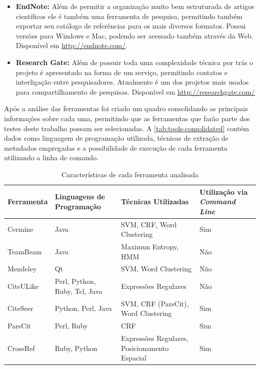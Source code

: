 \begin{itemize}
    \item \textbf{EndNote:} Além de permitir a organização muito bem estruturada de artigos científicos ele é também uma ferramenta de pesquisa, permitindo também exportar seu catálogo de referências para os mais diversos formatos. Possui versões para Windows e Mac, podendo ser acessado também através da Web. Disponível em \url{http://endnote.com/}.
    \item \textbf{Research Gate:} Além de possuir toda uma complexidade técnica por trás o projeto é apresentado na forma de um serviço, permitindo contatos e interligação entre pesquisadores. Atualmente é um dos projetos mais usados para compartilhamento de pesquisas. Disponível em \url{http://researchgate.com/}
\end{itemize}

Após a análise das ferramentas foi criado um quadro consolidando as principais informações sobre cada uma, permitindo que as ferramentas que farão parte dos testes deste trabalho possam ser selecionadas. A \autoref{tab:tools-consolidated} contém dados como linguagem de programação utilizada, técnicas de extração de metadados empregadas e a possibilidade de execução de cada ferramenta utilizando a linha de comando.

\begin{table}
    \caption{Características de cada ferramenta analisada}
    \begin{center}
        \begin{tabular}{|C{3cm}|C{3cm}|C{3cm}|C{4cm}|}
            \hline 
            \textbf{Ferramenta} & \textbf{Linguagens de Programação} & \textbf{Técnicas Utilizadas} & \textbf{Utilização via \emph{Command Line}} \\ 
            \hline 
            Cermine & Java & SVM, CRF, Word Clustering & Sim \\ \hline
            TeamBeam & Java & Maximun Entropy, HMM & Não \\ \hline
            Mendeley & Qt & SVM, Word Clustering & Não \\ \hline
            CiteULike & Perl, Python, Ruby, Tcl, Java & Expressões Regulares & Não \\ \hline
            CiteSeer & Python, Perl, Java & SVM, CRF (ParsCit), Word Clustering & Sim \\ \hline
            ParsCit & Perl, Ruby & CRF & Sim \\ \hline
            CrossRef & Ruby, Python & Expressões Regulares, Posicionamento Espacial  & Sim \\ \hline
        \end{tabular}
    \end{center}
    \label{tab:tools-consolidated}
\end{table}


